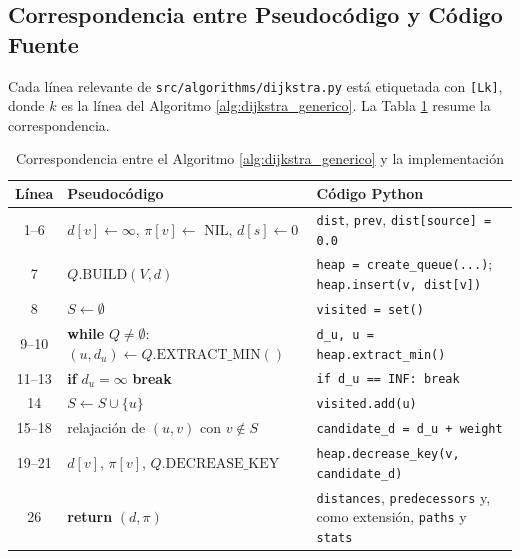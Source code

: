\subsection{Correspondencia entre Pseudocódigo y Código Fuente}
Cada línea relevante de \texttt{src/algorithms/dijkstra.py} está etiquetada con \texttt{[Lk]}, donde $k$ es la línea del Algoritmo \ref{alg:dijkstra_generico}. La Tabla \ref{tab:pseudo_codigo} resume la correspondencia.

\begin{table}[H]
    \caption{Correspondencia entre el Algoritmo \ref{alg:dijkstra_generico} y la implementación}
    \label{tab:pseudo_codigo}
    \begin{tabularx}{\textwidth}{@{}c>{\raggedright\arraybackslash}p{5.2cm}X@{}}
        \toprule
        \textbf{Línea} & \textbf{Pseudocódigo} & \textbf{Código Python} \\
        \midrule
        1--6 & $d[v]\leftarrow\infty$, $\pi[v]\leftarrow$ NIL, $d[s]\leftarrow 0$ & \texttt{dist}, \texttt{prev}, \texttt{dist[source] = 0.0} \\
        7 & $Q.\text{BUILD}(V, d)$ & \texttt{heap = create\_queue(...)}; \texttt{heap.insert(v, dist[v])} \\
        8 & $S \leftarrow \emptyset$ & \texttt{visited = set()} \\
        9--10 & \textbf{while} $Q \ne \emptyset$: $(u, d_u) \leftarrow Q.\text{EXTRACT\_MIN}()$ & \texttt{d\_u, u = heap.extract\_min()} \\
        11--13 & \textbf{if} $d_u = \infty$ \textbf{break} & \texttt{if d\_u == INF: break} \\
        14 & $S \leftarrow S \cup \{u\}$ & \texttt{visited.add(u)} \\
        15--18 & relajación de $(u, v)$ con $v \notin S$ & \texttt{candidate\_d = d\_u + weight} \\
        19--21 & $d[v]$, $\pi[v]$, $Q.\text{DECREASE\_KEY}$ & \texttt{heap.decrease\_key(v, candidate\_d)} \\
        26 & \textbf{return} $(d, \pi)$ & \texttt{distances}, \texttt{predecessors} y, como extensión, \texttt{paths} y \texttt{stats} \\
        \bottomrule
    \end{tabularx}
\end{table}




